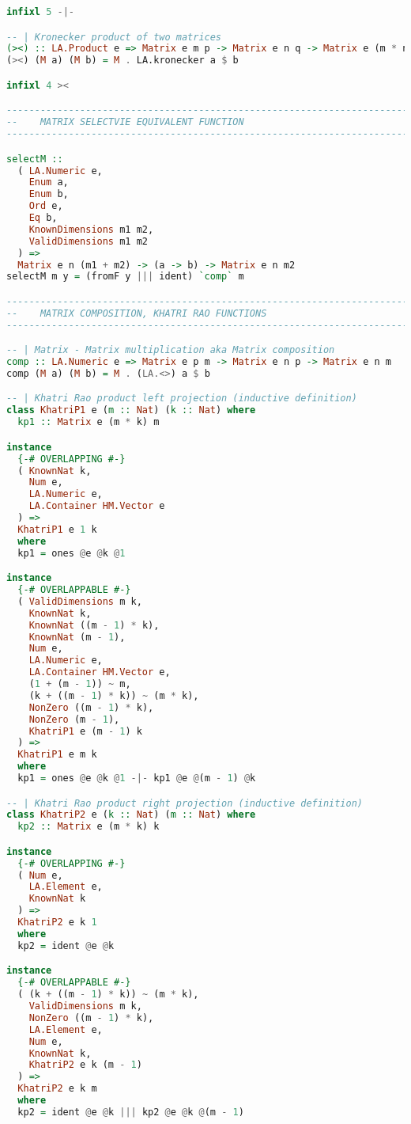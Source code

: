 \documentclass[
  oneside,
  11pt, a4paper,
  footinclude=true,
  headinclude=true,
  cleardoublepage=empty
]{scrbook}
\theoremstyle{definition}
\theoremstyle{definition}
\begin{document}
\begin{lstlisting}[language=Haskell, caption={Matrix.Internal},captionpos=b]
infixl 5 -|-

-- | Kronecker product of two matrices
(><) :: LA.Product e => Matrix e m p -> Matrix e n q -> Matrix e (m * n) (p * q)
(><) (M a) (M b) = M . LA.kronecker a $ b

infixl 4 ><

-------------------------------------------------------------------------------
--    MATRIX SELECTVIE EQUIVALENT FUNCTION
-------------------------------------------------------------------------------

selectM ::
  ( LA.Numeric e,
    Enum a,
    Enum b,
    Ord e,
    Eq b,
    KnownDimensions m1 m2,
    ValidDimensions m1 m2
  ) =>
  Matrix e n (m1 + m2) -> (a -> b) -> Matrix e n m2
selectM m y = (fromF y ||| ident) `comp` m

-------------------------------------------------------------------------------
--    MATRIX COMPOSITION, KHATRI RAO FUNCTIONS
-------------------------------------------------------------------------------

-- | Matrix - Matrix multiplication aka Matrix composition
comp :: LA.Numeric e => Matrix e p m -> Matrix e n p -> Matrix e n m
comp (M a) (M b) = M . (LA.<>) a $ b

-- | Khatri Rao product left projection (inductive definition)
class KhatriP1 e (m :: Nat) (k :: Nat) where
  kp1 :: Matrix e (m * k) m

instance
  {-# OVERLAPPING #-}
  ( KnownNat k,
    Num e,
    LA.Numeric e,
    LA.Container HM.Vector e
  ) =>
  KhatriP1 e 1 k
  where
  kp1 = ones @e @k @1

instance
  {-# OVERLAPPABLE #-}
  ( ValidDimensions m k,
    KnownNat k,
    KnownNat ((m - 1) * k),
    KnownNat (m - 1),
    Num e,
    LA.Numeric e,
    LA.Container HM.Vector e,
    (1 + (m - 1)) ~ m,
    (k + ((m - 1) * k)) ~ (m * k),
    NonZero ((m - 1) * k),
    NonZero (m - 1),
    KhatriP1 e (m - 1) k
  ) =>
  KhatriP1 e m k
  where
  kp1 = ones @e @k @1 -|- kp1 @e @(m - 1) @k

-- | Khatri Rao product right projection (inductive definition)
class KhatriP2 e (k :: Nat) (m :: Nat) where
  kp2 :: Matrix e (m * k) k

instance
  {-# OVERLAPPING #-}
  ( Num e,
    LA.Element e,
    KnownNat k
  ) =>
  KhatriP2 e k 1
  where
  kp2 = ident @e @k

instance
  {-# OVERLAPPABLE #-}
  ( (k + ((m - 1) * k)) ~ (m * k),
    ValidDimensions m k,
    NonZero ((m - 1) * k),
    LA.Element e,
    Num e,
    KnownNat k,
    KhatriP2 e k (m - 1)
  ) =>
  KhatriP2 e k m
  where
  kp2 = ident @e @k ||| kp2 @e @k @(m - 1)


\end{lstlisting}
\end{document}
